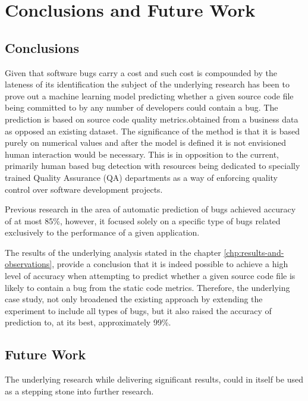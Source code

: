 \chapter{Conclusions and Future Work}\label{chp:conclusions-and-future-work}
\section{Conclusions}\label{sec:conlclusions}
Given that software bugs carry a cost and such cost is compounded by the lateness of its identification\cite{autoDetectionOfPerfBugs} the subject of the underlying research has been to prove out a machine learning model predicting whether a given source code file being committed to by any number of developers could contain a bug. The prediction is based on source code quality metrics.obtained from a business data as opposed an existing dataset. The significance of the method is that it is based purely on numerical values and after the model is defined it is not envisioned human interaction would be necessary. This is in opposition to the current, primarily human based bug detection with resources being dedicated to specially trained Quality Assurance (QA) departments as a way of enforcing quality control over software development projects. 

Previous research in the area of automatic prediction of bugs \cite{autoDetectionOfPerfBugs} achieved accuracy of at most 85\%, however, it focused solely on a specific type of bugs related exclusively to the performance of a given application. 

The results of the underlying analysis stated in the chapter \ref{chp:results-and-observations}, provide a conclusion that it is indeed possible to achieve a high level of accuracy when attempting to predict whether a given source code file is likely to contain a bug from the static code metrics. Therefore, the underlying case study, not only broadened the existing approach by extending the experiment to include all types of bugs, but it also raised the accuracy of prediction to, at its best, approximately 99\%.



\section{Future Work}\label{sec:future-work}
The underlying research while delivering significant results, could in itself be used as a stepping stone into further research.

